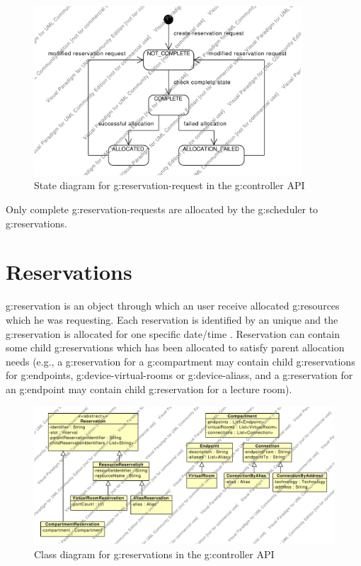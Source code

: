 \begin{figure}[ht!]
\centering\includegraphics[width=10cm]{diagrams/smd_api_reservation_request}
\caption{State diagram for \gls{g:reservation-request} in the \gls{g:controller} API}
\label{fig:smd_api_reservation_request}
\end{figure}

Only complete \glspl{g:reservation-request} are allocated by the \gls{g:scheduler} to \glspl{g:reservation}.


\section{Reservations}

\Gls{g:reservation} is an object through which an user receive allocated \glspl{g:resource} which he was requesting. Each reservation is identified by an unique  and the \gls{g:reservation} is allocated for one specific date/time . Reservation can contain some child \glspl{g:reservation} which has been allocated to satisfy parent allocation needs (e.g., a \gls{g:reservation} for a \gls{g:compartment} may contain child \glspl{g:reservation} for \glspl{g:endpoint}, \glspl{g:device-virtual-room} or \glspl{g:device-alias}, and a \gls{g:reservation} for an \gls{g:endpoint} may contain child \gls{g:reservation} for a lecture room).

\begin{figure}[ht!]
\includegraphics[width=\textwidth]{diagrams/cd_api_reservations}
\caption{Class diagram for \glspl{g:reservation} in the \gls{g:controller} API}
\label{fig:cd_api_reservations}
\end{figure}

